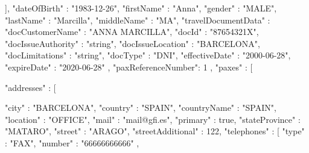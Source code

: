 {{{                                               }
                               ],
                               "dateOfBirth" : "1983-12-26",
                               "firstName" : "Anna",
                               "gender" : "MALE",
                               "lastName" : "Marcilla",
                               "middleName" : "MA",
                               "travelDocumentData" : {
                                               "docCustomerName" : "ANNA MARCILLA",
                                               "docId" : "87654321X",
                                               "docIssueAuthority" : "string",
                                               "docIssueLocation" : "BARCELONA",
                                               "docLimitations" : "string",
                                               "docType" : "DNI",
                                               "effectiveDate" : "2000-06-28",
                                               "expireDate" : "2020-06-28"
                               },
                               "paxReferenceNumber": 1
                },
                "paxes" : [{
                                               "addresses" : [{
                                                                              "city" : "BARCELONA",
                                                                              "country" : "SPAIN",
                                                                              "countryName" : "SPAIN",
                                                                              "location" : "OFFICE",
                                                                              "mail" : "mail@gfi.es",
                                                                              "primary" : true,
                                                                              "stateProvince" : "MATARO",
                                                                              "street" : "ARAGO",
                                                                              "streetAdditional" : 122,
                                                                              "telephones" : [{
                                                                                                              "type" : "FAX",
                                                                                                              "number" : "66666666666"
                                                                                              }, {

}}}}
